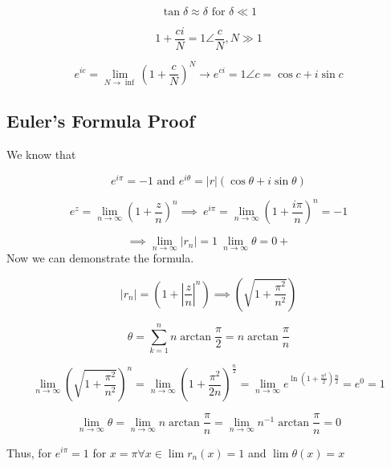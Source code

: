 \[
	\tan{\delta} \approx \delta \text{ for } \delta \ll 1
\]

\[
	1 + \frac{ci}{N} = 1 \angle \frac{c}{N}, N \gg 1
\]

\[
	e^{ic} = \lim_{N \to \inf} {\left( 1 + \frac{c}{N}\right)}^N \to e^{ci} = 1 \angle c = \cos{c} + 
	i\sin{c}
\]

\subsection{Euler's Formula Proof}

We know that

\[
	e^{i\pi} = -1 \text{ and } e^{i\theta} = |r|(\cos{\theta} + i\sin{\theta})
\]

\[
	e^{z} = \lim_{n \to \infty} {\left( 1 + \frac{z}{n}\right)}^n \implies\ e^{i\pi} = 
	\lim_{n \to \infty} {\left( 1 + \frac{i\pi}{n}\right)}^n = -1
\]

\[
	\implies \lim_{n \to \infty} |r_n| = 1\ \lim_{n \to \infty} \theta = 0+
\]
 Now we can demonstrate the formula.

\[
	|r_n| = \left( 1 + \left|\frac{z}{n}\right|^n \right) \implies 
	\left( \sqrt{1 + \frac{\pi^2}{n^2}}\right)
\]

\[
	\theta = \sum_{k = 1}^{n} n \arctan \frac{\pi}{2} = n \arctan \frac{\pi}{n}
\]

\[
	\lim_{n \to \infty} {\left( \sqrt{1 + \frac{\pi^2}{n^2}}\right)}^n = \lim_{n \to \infty} 
	{\left( 1 + \frac{\pi^2}{2n} \right) }^{\frac{n}{2}}
	= \lim_{n \to \infty} e^{\ln\left(1 +\frac{\pi^2}{2}\right) \frac{n}{2}} = e^0 = 1
\]

\[
	\lim_{n \to \infty} \theta = \lim_{n \to \infty} n \arctan \frac{\pi}{n} = \lim_{n \to \infty} 
	n^{-1} \arctan\frac{\pi}{n} = 0
\]

Thus, for \(e^{i\pi} = 1\) for \(x = \pi \forall x \in \lim r_n (x) = 1\) and \( \lim \theta (x) = x\)

\QED

